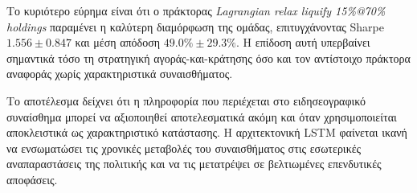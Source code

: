 \begin{table}[htbp]
  \centering
  \caption{Αποτελέσματα ομάδας FinGPT με χαρακτηριστικά \textbf{μόνο στον χώρο καταστάσεων} (CPCV/Optuna, κόστος $10^{-4}$, περίοδος αξιολόγησης 2024--2025, μέσος $\pm$ τυπική απόκλιση 5 εκτελέσεων).}
  \label{tab:g13-test}
  \small
\end{table}

Το κυριότερο εύρημα είναι ότι ο πράκτορας
\textit{Lagrangian relax liquify 15\%@70\% holdings}
παραμένει η καλύτερη διαμόρφωση της ομάδας, επιτυγχάνοντας Sharpe
$1.556 \pm 0.847$ και μέση απόδοση $49.0\% \pm 29.3\%$.
Η επίδοση αυτή υπερβαίνει σημαντικά τόσο τη στρατηγική αγοράς-και-κράτησης όσο και τον αντίστοιχο
πράκτορα αναφοράς χωρίς χαρακτηριστικά συναισθήματος.

Το αποτέλεσμα δείχνει ότι η πληροφορία που περιέχεται στο ειδησεογραφικό συναίσθημα μπορεί να
αξιοποιηθεί αποτελεσματικά ακόμη και όταν χρησιμοποιείται αποκλειστικά ως χαρακτηριστικό κατάστασης.
Η αρχιτεκτονική LSTM φαίνεται ικανή να ενσωματώσει τις χρονικές μεταβολές του συναισθήματος στις
εσωτερικές αναπαραστάσεις της πολιτικής και να τις μετατρέψει σε βελτιωμένες επενδυτικές αποφάσεις.

